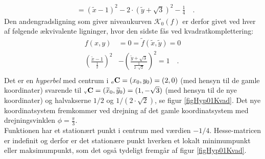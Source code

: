 \begin{example}[Hyperbel]
\begin{equation}
\begin{aligned}
&= (\widetilde{x}-1)^{2} - 2\cdot (\widetilde{y}+ \sqrt{3})^{2} - \frac{1}{4} \quad.
\end{aligned}
\end{equation}
Den andengradsligning som giver niveaukurven $\mathcal{K}_{0}(f)$ er derfor givet ved hver af følgende ækvivalente ligninger, hvor den sidste fås ved kvadratkomplettering:
\begin{equation}
\begin{aligned}
f(x,y) &= 0 =
\widetilde{f}(\widetilde{x}, \widetilde{y}) = 0 \\
\left(\frac{\widetilde{x}-1}{\frac{1}{2}}\right)^{2} &- \left(\frac{\widetilde{y}+ \sqrt{3}}{\frac{1}{2\cdot \sqrt{2}}} \right)^{2} = 1 \quad . \\
\end{aligned}
\end{equation}
Det er en \emph{hyperbel} med centrum i ${_\mathrm{e}\mathbf{\mathbf{C}}} = (x_{0}, y_{0}) =  (2,0)$ (med hensyn til de gamle koordinater) svarende til
${_\mathrm{v}\mathbf{\mathbf{C}}} = (\widetilde{x}_{0}, \widetilde{y}_{0}) = (1, -\sqrt{3} )$ (med hensyn til de nye koordinater)  og halvakserne $1/2$ og $1/(2\cdot \sqrt{2})$, se figur \ref{figHyp01Kvad}. Det nye koordinatsystem fremkommer ved drejning af det gamle koordinatsystem med drejningsvinklen $\phi = \frac{\pi}{3}$.\\

Funktionen har et stationært punkt i centrum med værdien $-1/4$. Hesse-matricen er indefinit og derfor er det stationære punkt hverken et lokalt minimumpunkt eller maksimumpunkt, som det også tydeligt fremgår af figur \ref{figHyp01Kvad}.
\end{example}



